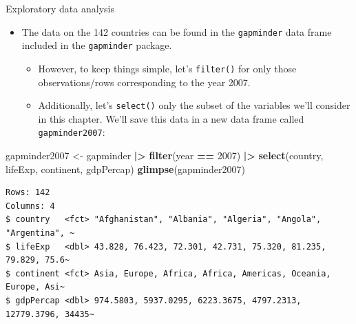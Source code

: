 \documentclass[
  ignorenonframetext,
]{beamer}
\newenvironment{Shaded}{\begin{snugshade}}{\end{snugshade}}
\newcommand{\DecValTok}[1]{\textcolor[rgb]{0.00,0.00,0.81}{#1}}
\newcommand{\FunctionTok}[1]{\textcolor[rgb]{0.13,0.29,0.53}{\textbf{#1}}}
\newcommand{\NormalTok}[1]{#1}
\newcommand{\OtherTok}[1]{\textcolor[rgb]{0.56,0.35,0.01}{#1}}
\newcommand{\SpecialCharTok}[1]{\textcolor[rgb]{0.81,0.36,0.00}{\textbf{#1}}}
\providecommand{\tightlist}{%
  \setlength{\itemsep}{0pt}\setlength{\parskip}{0pt}}
\begin{document}
\begin{frame}[fragile]{Exploratory data analysis}
\protect\hypertarget{exploratory-data-analysis}{}
\begin{itemize}
\item
  The data on the 142 countries can be found in the \texttt{gapminder}
  data frame included in the \texttt{gapminder} package.

  \begin{itemize}
  \tightlist
  \item
    However, to keep things simple, let's \texttt{filter()} for only
    those observations/rows corresponding to the year 2007.
  \item
    Additionally, let's \texttt{select()} only the subset of the
    variables we'll consider in this chapter. We'll save this data in a
    new data frame called \texttt{gapminder2007}:
  \end{itemize}
\end{itemize}

\small

\begin{Shaded}
\begin{Highlighting}[]
\NormalTok{gapminder2007 }\OtherTok{\textless{}{-}}\NormalTok{ gapminder }\SpecialCharTok{|\textgreater{}} 
  \FunctionTok{filter}\NormalTok{(year }\SpecialCharTok{==} \DecValTok{2007}\NormalTok{) }\SpecialCharTok{|\textgreater{}}
  \FunctionTok{select}\NormalTok{(country, lifeExp, continent, gdpPercap)}
\FunctionTok{glimpse}\NormalTok{(gapminder2007)}
\end{Highlighting}
\end{Shaded}

\begin{verbatim}
Rows: 142
Columns: 4
$ country   <fct> "Afghanistan", "Albania", "Algeria", "Angola", "Argentina", ~
$ lifeExp   <dbl> 43.828, 76.423, 72.301, 42.731, 75.320, 81.235, 79.829, 75.6~
$ continent <fct> Asia, Europe, Africa, Africa, Americas, Oceania, Europe, Asi~
$ gdpPercap <dbl> 974.5803, 5937.0295, 6223.3675, 4797.2313, 12779.3796, 34435~
\end{verbatim}

\normalsize
\end{frame}
\end{document}
